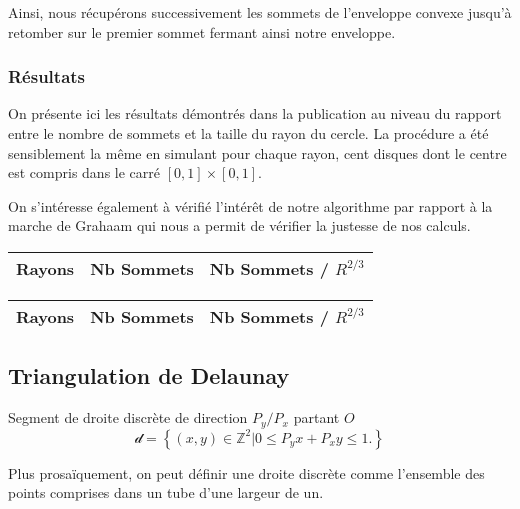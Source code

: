 Ainsi, nous récupérons successivement les sommets de l'enveloppe convexe jusqu'à retomber sur le premier sommet fermant ainsi notre enveloppe.

\subsubsection{Résultats}

On présente ici les résultats démontrés dans la publication au niveau du rapport entre le nombre de sommets et la taille du rayon du cercle. La procédure a été sensiblement la même en simulant pour chaque rayon, cent disques dont le centre est compris dans le carré $[0,1]\times[0,1]$.

On s'intéresse également à vérifié l'intérêt de notre algorithme par rapport à la marche de Grahaam qui nous a permit de vérifier la justesse de nos calculs. 


\begin{tabular}{|l||c|c|}
\hline
Rayons & Nb Sommets & Nb Sommets / $R^{2/3}$\\
\hline

\hline
\end{tabular} 

\begin{tabular}{|l||c|c|}
\hline
Rayons & Nb Sommets & Nb Sommets / $R^{2/3}$\\
\hline

\hline
\end{tabular} 

\subsection{Triangulation de Delaunay}

\begin{Definition}{Segment de droite discrète de direction $P_y / P_x$ partant $O$}
\label{def:sdd}
    $$\mathcal{d} =  \left\{ (x,y) \in \mathbb{Z}^{2} |  0 \leq P_y x + P_x y \leq 1. \right\}$$
\end{Definition}

Plus prosaïquement, on peut définir une droite discrète comme l'ensemble des points comprises dans un tube d'une largeur de un.


